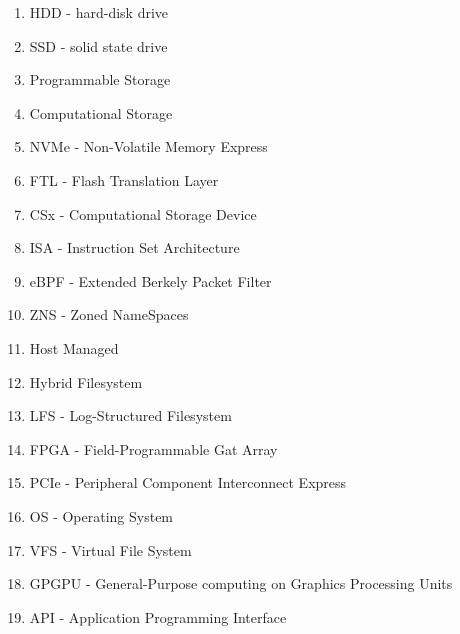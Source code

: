 \documentclass[conference]{IEEEtran}
\begin{document}
\begin{enumerate}
	\item HDD - hard-disk drive %
	\item SSD - solid state drive %
	\item Programmable Storage %
	\item Computational Storage %
	\item NVMe - Non-Volatile Memory Express %
	\item FTL - Flash Translation Layer %
	\item CSx - Computational Storage Device %
	\item ISA - Instruction Set Architecture %
	\item eBPF - Extended Berkely Packet Filter %
	\item ZNS - Zoned NameSpaces %
	\item Host Managed %
	\item Hybrid Filesystem %
	\item LFS - Log-Structured Filesystem %
	\item FPGA - Field-Programmable Gat Array %
	\item PCIe - Peripheral Component Interconnect Express %
	\item OS - Operating System %
	\item VFS - Virtual File System %
	\item GPGPU - General-Purpose computing on Graphics Processing Units %
	\item API - Application Programming Interface %
\end{enumerate}



\end{document}
